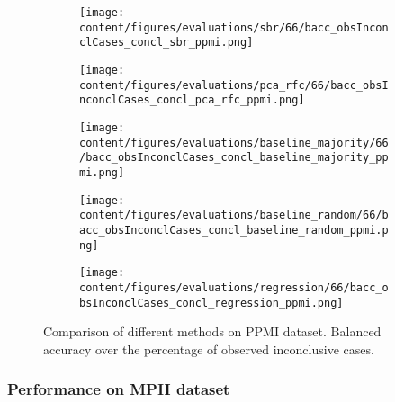 \begin{figure}[ht]
  \begin{subfigure}{0.45\textwidth}
    \centering
    \texttt{[image: content/figures/evaluations/sbr/66/bacc\_obsInconclCases\_concl\_sbr\_ppmi.png]}
  \end{subfigure}
  \hfill
  \begin{subfigure}{0.45\textwidth}
    \centering
    \texttt{[image: content/figures/evaluations/pca\_rfc/66/bacc\_obsInconclCases\_concl\_pca\_rfc\_ppmi.png]}
  \end{subfigure}
  \hfill
  \begin{subfigure}{0.45\textwidth}
    \centering
    \texttt{[image: content/figures/evaluations/baseline\_majority/66/bacc\_obsInconclCases\_concl\_baseline\_majority\_ppmi.png]}
  \end{subfigure}
  \hfill
  \begin{subfigure}{0.45\textwidth}
    \centering
    \texttt{[image: content/figures/evaluations/baseline\_random/66/bacc\_obsInconclCases\_concl\_baseline\_random\_ppmi.png]}
  \end{subfigure}
  \hfill
  \begin{subfigure}{0.45\textwidth}
    \centering
    \texttt{[image: content/figures/evaluations/regression/66/bacc\_obsInconclCases\_concl\_regression\_ppmi.png]}
  \end{subfigure}

  \caption{Comparison of different methods on PPMI dataset. 
  Balanced accuracy over the percentage of observed inconclusive cases.}
  \label{fig:test_ppmi}
\end{figure}



\subsubsection{Performance on MPH dataset}

